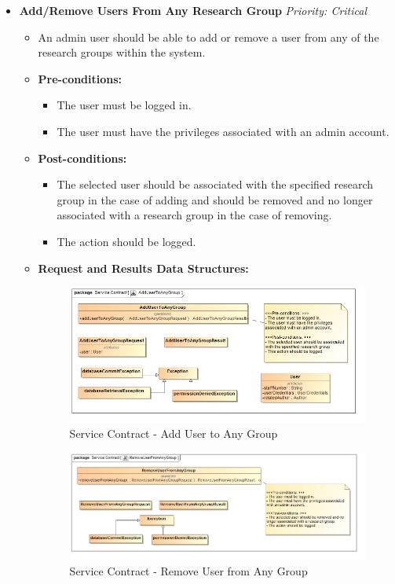 \documentclass{article}
\begin{document}
\begin{itemize}
					\cleardoublepage
					\item \textbf{Add/Remove Users From Any Research Group} \hfill \textit{Priority: Critical}
					\begin{itemize}
						\item An admin user should be able to add or remove a user from any of the research groups within the system.
						\item \textbf{Pre-conditions:}
						\begin{itemize}
							\item The user must be logged in.
							\item The user must have the privileges associated with an admin account.
						\end{itemize}
						\item \textbf{Post-conditions:}
						\begin{itemize}
							\item The selected user should be associated with the specified research group in the case of adding and should be removed and no longer associated with a research group in the case of removing.
							\item The action should be logged.
						\end{itemize}
						\item \textbf{Request and Results Data Structures:}
						\begin{figure}[H]
							\includegraphics[width=\linewidth]{../Diagrams/ServiceContracts/User subsystem/AddUserToAnyGroup.jpg}
							\caption{Service Contract - Add User to Any Group}
						\end{figure}
						\begin{figure}[H]
							\includegraphics[width=\linewidth]{../Diagrams/ServiceContracts/User subsystem/RemoveUserFromAnyGroup.jpg}
							\caption{Service Contract - Remove User from Any Group}
						\end{figure}
					\end{itemize}
				\end{itemize}
				
\end{document}

